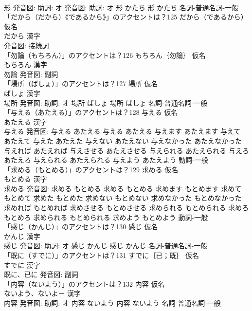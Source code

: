 \documentclass[8pt]{extreport}
\begin{document}
\begin{CJK}{UTF8}{min}
\\	形 発音図: 助詞: オ 発音図: 助詞: オ	形 かたち		形 かたち				名詞-普通名詞-一般 
\\	「だから（だから）《であるから》」のアクセントは？125	だから（であるから） 仮名　
\\	だから 漢字　
\\	発音図:							接続詞 
\\	「勿論（もちろん）」のアクセントは？126	もちろん｛勿論｝ 仮名　
\\	もちろん 漢字　
\\	勿論 発音図:							副詞 
\\	「場所（ばしょ）」のアクセントは？127	場所 仮名　
\\	ばしょ 漢字　
\\	場所 発音図: 助詞: オ	場所 ばしょ		場所 ばしょ				名詞-普通名詞-一般 
\\	「与える（あたえる）」のアクセントは？128	与える 仮名　
\\	あたえる 漢字　
\\	与える 発音図:	与える あたえる		与える あたえる 与えます あたえます 与えて あたえて 与えた あたえた 与えない あたえない 与えなかった あたえなかった 与えれば あたえれば 与えさせる あたえさせる 与えられる あたえられる 与えろ あたえろ 与えられる あたえられる 与えよう あたえよう				動詞-一般 
\\	「求める（もとめる）」のアクセントは？129	求める 仮名　
\\	もとめる 漢字　
\\	求める 発音図:	求める もとめる		求める もとめる 求めます もとめます 求めて もとめて 求めた もとめた 求めない もとめない 求めなかった もとめなかった 求めれば もとめれば 求めさせる もとめさせる 求められる もとめられる 求めろ もとめろ 求められる もとめられる 求めよう もとめよう				動詞-一般 
\\	「感じ（かんじ）」のアクセントは？130	感じ 仮名　
\\	かんじ 漢字　
\\	感じ 発音図: 助詞: オ	感じ かんじ		感じ かんじ				名詞-普通名詞-一般 
\\	「既に（すでに）」のアクセントは？131	すでに｛已；既｝ 仮名　
\\	すでに 漢字　
\\	既に、已に 発音図:							副詞 
\\	「内容（ないよう）」のアクセントは？132	内容 仮名　
\\	ないよう、ないよー 漢字　
\\	内容 発音図: 助詞: オ	内容 ないよう		内容 ないよう				名詞-普通名詞-一般 

\end{CJK}
\end{document}
